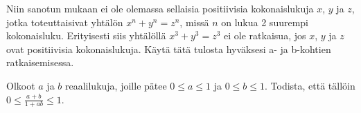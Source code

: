 \begin{kotitehtavasivu}
	\begin{tehtava}
		Niin sanotun  mukaan ei ole
		olemassa sellaisia positiivisia kokonaislukuja $x$, $y$
		ja $z$, jotka toteuttaisivat yhtälön $x^{n} + y^{n} = z^{n}$,
		missä $n$ on lukua 2 suurempi kokonaisluku.
		Erityisesti siis yhtälöllä $x^{3} + y^{3} = z^{3}$ ei
		ole ratkaisua, jos $x$, $y$ ja $z$ ovat positiivisia
		kokonaislukuja. Käytä tätä tulosta hyväksesi a- ja b-kohtien ratkaisemisessa.
		\begin{vastaus}
		\end{vastaus}
	\end{tehtava}

	\begin{tehtava}
		Olkoot $a$ ja $b$ reaalilukuja, joille pätee $0 \le a \le 1$ ja $0 \le b \le 1$.
		Todista, että tällöin $0 \le \frac{a + b}{1 + ab} \le 1$.
	\end{tehtava}

\end{kotitehtavasivu}
